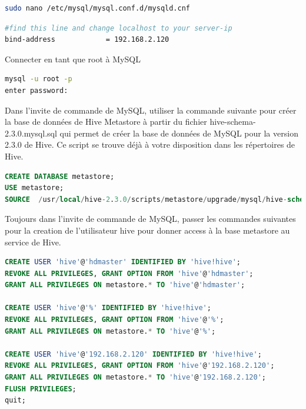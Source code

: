 \documentclass[12pt,french]{book}
\begin{document}
\begin{lstlisting}[language=bash, frame=single]
sudo nano /etc/mysql/mysql.conf.d/mysqld.cnf 
\end{lstlisting}

\begin{lstlisting}[language=bash, frame=single]
#find this line and change localhost to your server-ip
bind-address            = 192.168.2.120
\end{lstlisting}

Connecter en tant que root à MySQL

\begin{lstlisting}[language=bash, frame=single]
mysql -u root -p
enter password:
\end{lstlisting}

Dans l’invite de commande de MySQL, utiliser la commande suivante pour créer la base de données de Hive Metastore à partir du fichier hive-schema-2.3.0.mysql.sql qui permet de créer la base de données de MySQL pour la version 2.3.0 de Hive.
Ce script se trouve déjà à votre disposition dans les répertoires de Hive.

\begin{lstlisting}[language=SQL, frame=single, breaklines=true, postbreak=\mbox{\textcolor{red}{$\hookrightarrow$}\space}]
CREATE DATABASE metastore;
USE metastore;
SOURCE  /usr/local/hive-2.3.0/scripts/metastore/upgrade/mysql/hive-schema-2.3.0.mysql.sql
\end{lstlisting}

Toujours dans l’invite de commande de MySQL, passer les commandes suivantes pour la creation de l’utilisateur hive pour donner access à la base metastore au service de Hive. 

\begin{lstlisting}[language=SQL, frame=single, breaklines=true, postbreak=\mbox{\textcolor{red}{$\hookrightarrow$}\space}]
CREATE USER 'hive'@'hdmaster' IDENTIFIED BY 'hive!hive';
REVOKE ALL PRIVILEGES, GRANT OPTION FROM 'hive'@'hdmaster';
GRANT ALL PRIVILEGES ON metastore.* TO 'hive'@'hdmaster';

CREATE USER 'hive'@'%' IDENTIFIED BY 'hive!hive';
REVOKE ALL PRIVILEGES, GRANT OPTION FROM 'hive'@'%';
GRANT ALL PRIVILEGES ON metastore.* TO 'hive'@'%';

CREATE USER 'hive'@'192.168.2.120' IDENTIFIED BY 'hive!hive';
REVOKE ALL PRIVILEGES, GRANT OPTION FROM 'hive'@'192.168.2.120';
GRANT ALL PRIVILEGES ON metastore.* TO 'hive'@'192.168.2.120';
FLUSH PRIVILEGES;
quit;
\end{lstlisting}
\end{document}
